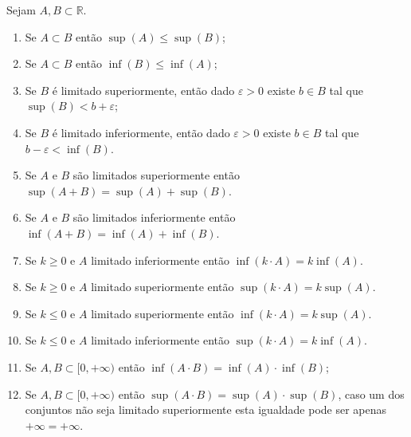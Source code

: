 \begin{subappendices}
\begin{teorema}\label{teo-prop-sup-inf}
Sejam $A,B\subset \mathbb{R}$.
\begin{enumerate}
	
	\item Se $A\subset B$ então $\sup(A)\leqslant \sup(B)$;
	
	\item Se $A\subset B$ então $\inf(B)\leqslant \inf(A)$;
	
	\item Se $B$ é limitado superiormente, então dado $\varepsilon>0$ existe $b\in B$ tal que 
	$\sup(B)<b+\varepsilon$; 
	
	\item Se $B$ é limitado inferiormente, então dado $\varepsilon>0$ existe $b\in B$ tal que\break
	$b-\varepsilon<\inf(B)$.  
	
	\item Se $A$ e $B$ são limitados superiormente então $\sup(A+B)=\sup(A)+\sup(B)$.
	
	\item Se $A$ e $B$ são limitados inferiormente então $\inf(A+B)=\inf(A)+\inf(B)$.
	
	\item Se $k\geqslant 0$ e $A$ limitado inferiormente então $\inf(k\cdot A)=k\inf(A)$.
	
	\item Se $k\geqslant 0$ e $A$ limitado superiormente então $\sup(k\cdot A)=k\sup(A)$.
	
	\item Se $k\leqslant 0$ e $A$ limitado superiormente então $\inf(k\cdot A)=k\sup(A)$.
	
	\item Se $k\leqslant 0$ e $A$ limitado inferiormente então $\sup(k\cdot A)=k\inf(A)$.
	
	\item Se $A,B\subset [0,+\infty)$ então $\inf(A\cdot B)= \inf(A)\cdot\inf(B)$;
	
	\item Se $A,B\subset [0,+\infty)$ então $\sup(A\cdot B)=\sup(A)\cdot\sup(B)$, 
	caso um dos conjuntos não seja limitado superiormente esta igualdade pode ser apenas  $+\infty=+\infty$.
\end{enumerate}
\end{teorema}

\end{subappendices}